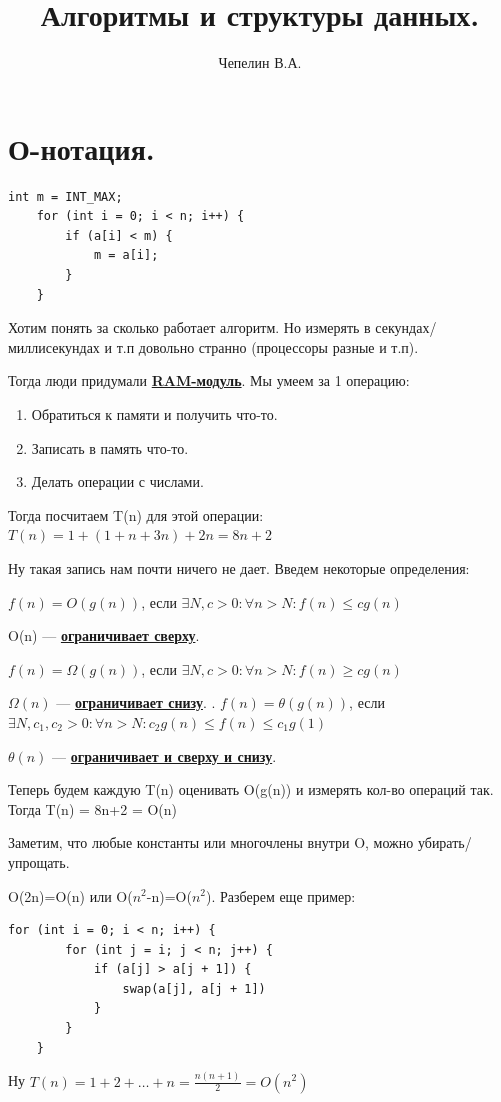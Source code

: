 \documentclass{article}
\title{Алгоритмы и структуры данных.}
\author{Чепелин В.А.}
\date{}
\newcommand{\deff}[1]{\underline{\textbf{#1}}}
\begin{document}
\maketitle


\tableofcontents
\pagebreak

\section{ О-нотация.}

\begin{lstlisting}[mathescape]
    int m = INT_MAX;
    for (int i = 0; i < n; i++) {
        if (a[i] < m) {
            m = a[i];
        }
    }
\end{lstlisting}
Хотим понять за сколько работает алгоритм. Но измерять в секундах/миллисекундах и т.п довольно странно (процессоры разные и т.п).

Тогда люди придумали \deff{RAM-модуль}. Мы умеем за 1 операцию:

\begin{enumerate}
    \item  Обратиться к памяти и получить что-то.
    \item Записать в память что-то.
    \item Делать операции с числами.
\end{enumerate}

Тогда посчитаем T(n) для этой операции: $T(n) = 1 + (1+n+3n)+2n=8n+2$

Ну такая запись нам почти ничего не дает. Введем некоторые определения:

$f(n)=O(g(n))$, если $\exists N,c>0: \forall n>N: f(n) \leq c g(n)$

O(n) --- \deff{ограничивает сверху}.

$f(n) = \Omega (g(n))$, если $\exists N,c>0: \forall n>N: f(n) \geq c g(n)$

$\Omega(n)$ --- \deff{ограничивает снизу}.
.
$f(n)=\theta(g(n))$, если$\exists N,c_1,c_2>0: \forall n>N: c_2 g(n)\leq f(n) \leq c_1 g(1)$

$\theta(n)$ --- \deff {ограничивает и сверху и снизу}.

Теперь будем каждую T(n) оценивать O(g(n)) и измерять кол-во операций так.
Тогда T(n) = 8n+2 = O(n)

Заметим, что любые константы или многочлены внутри  O, можно убирать/упрощать.

O(2n)=O(n) или O($n^2$-n)=O($n^2$).
Разберем еще пример:

\begin{lstlisting}[mathescape]
for (int i = 0; i < n; i++) {
        for (int j = i; j < n; j++) {
            if (a[j] > a[j + 1]) {
                swap(a[j], a[j + 1])
            }
        }
    }
\end{lstlisting}
Ну $T(n) = 1+2+\dots+n=\tfrac{n(n+1)}{2}=O(n^2)$
\end{document}

